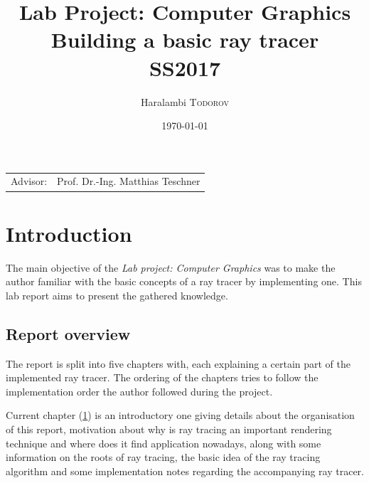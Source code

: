 \documentclass{article}
\title{Lab Project: Computer Graphics \\ Building a basic ray tracer \\ SS2017} %
\author{Haralambi \textsc{Todorov}} %
\date{\today} %
\begin{document}
\maketitle %

\begin{center}
\begin{tabular}{l r}
Advisor: & Prof. Dr.-Ing. Matthias Teschner %
\end{tabular}
\end{center}



\section{Introduction}
\label{sec:intro}
The main objective of the \textit{Lab project: Computer Graphics} was to make the author familiar with the basic concepts of a ray tracer by implementing one. This lab report aims to present the gathered knowledge.

\subsection{Report overview}
The report is split into five chapters with, each explaining a certain part of the implemented ray tracer. The ordering of the chapters tries to follow the implementation order the author followed during the project. 

\vspace*{\baselineskip}

Current chapter (\ref{sec:intro}) is an introductory one giving details about the organisation of this report, motivation about why is ray tracing an important rendering technique and where does it find application nowadays, along with some information on the roots of ray tracing, the basic idea of the ray tracing algorithm and some implementation notes regarding the accompanying ray tracer.

\vspace*{\baselineskip}
\end{document}

